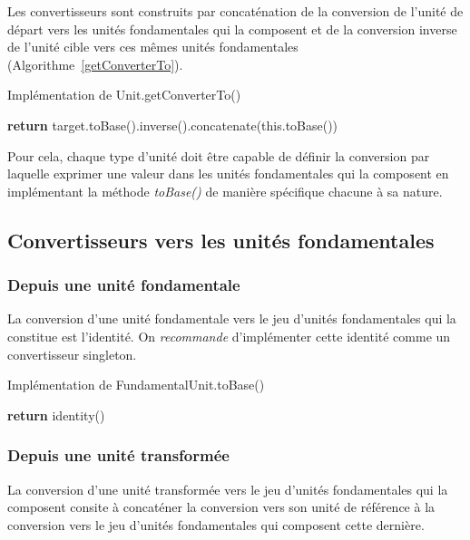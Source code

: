 \documentclass[a4paper,twoside,10pt]{article}
\begin{document}
Les convertisseurs sont construits par concaténation de la conversion de l'unité de départ vers les unités fondamentales
qui la composent et de la conversion inverse de l'unité cible vers ces mêmes unités fondamentales
(Algorithme~\ref{getConverterTo}).

\begin{algorithm}[!h]
\caption{Implémentation de Unit.getConverterTo()}\label{getConverterTo}
\begin{algorithmic}
\State \textbf{return} target.toBase().inverse().concatenate(this.toBase())
\EndProcedure
\end{algorithmic}
\end{algorithm}

Pour cela, chaque type d'unité doit être capable de définir la conversion par laquelle exprimer une valeur dans les
unités fondamentales qui la composent en implémentant la méthode \emph{toBase()} de manière spécifique chacune à sa
nature.

\subsection{Convertisseurs vers les unités fondamentales}


\subsubsection{Depuis une unité fondamentale}

La conversion d'une unité fondamentale vers le jeu d'unités fondamentales qui la constitue est l'identité. On
\emph{recommande} d'implémenter cette identité comme un convertisseur singleton.

\begin{algorithm}[!h]
\caption{Implémentation de FundamentalUnit.toBase()}\label{fundamentalToBase}
\begin{algorithmic}
\State \textbf{return} identity()
\EndProcedure
\end{algorithmic}
\end{algorithm}


\subsubsection{Depuis une unité transformée}

La conversion d'une unité transformée vers le jeu d'unités fondamentales qui la composent consite à concaténer la
conversion vers son unité de référence à la conversion vers le jeu d'unités fondamentales qui composent cette dernière.
\end{document}
